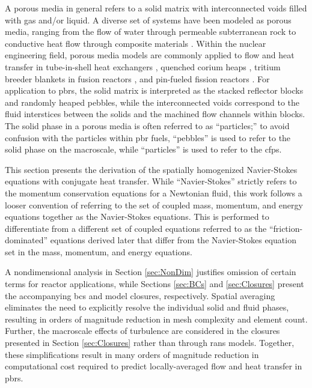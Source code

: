 A porous media in general refers to a solid matrix with interconnected voids filled with gas and/or liquid. A diverse set of systems have been modeled as porous media, ranging from the flow of water through permeable subterranean rock to conductive heat flow through composite materials \cite{diersch}. Within the nuclear engineering field, porous media models are commonly applied to flow and heat transfer in tube-in-shell heat exchangers \cite{ge_prhr}, quenched corium heaps \cite{magallon,raverdy}, tritium breeder blankets in fusion reactors \cite{xu_cfetr,zhang2016,guo2006}, and pin-fueled fission reactors \cite{zarifi}. For application to \glspl{pbr}, the solid matrix is interpreted as the stacked reflector blocks and randomly heaped pebbles, while the interconnected voids correspond to the fluid interstices between the solids and the machined flow channels within blocks. The solid phase in a porous media is often referred to as ``particles;'' to avoid confusion with the particles within \gls{pbr} fuels, ``pebbles'' is used to refer to the solid phase on the macroscale, while ``particles'' is used to refer to the \glspl{cfp}.

This section presents the derivation of the spatially homogenized Navier-Stokes equations with conjugate heat transfer. While ``Navier-Stokes'' strictly refers to the momentum conservation equations for a Newtonian fluid, this work follows a looser convention of referring to the set of coupled mass, momentum, and energy equations together as the Navier-Stokes equations. This is performed to differentiate from a different set of coupled equations referred to as the ``friction-dominated'' equations derived later that differ from the Navier-Stokes equation set in the mass, momentum, and energy equations.

A nondimensional analysis in Section \ref{sec:NonDim} justifies omission of certain terms for reactor applications, while Sections \ref{sec:BCs} and \ref{sec:Closures} present the accompanying \glspl{bc} and model closures, respectively. Spatial averaging eliminates the need to explicitly resolve the individual solid and fluid phases, resulting in orders of magnitude reduction in mesh complexity and element count. Further, the macroscale effects of turbulence are considered in the closures presented in Section \ref{sec:Closures} rather than through \gls{rans} models. Together, these simplifications result in many orders of magnitude reduction in computational cost required to predict locally-averaged flow and heat transfer in \glspl{pbr}.

